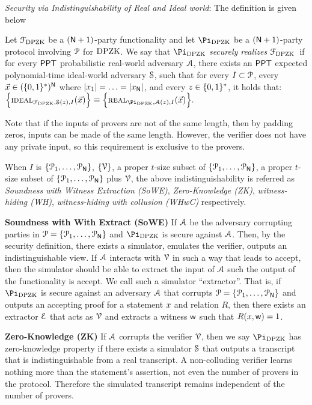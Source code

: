 \noindent\textit{Security via Indistinguishability of Real and Ideal world}: The definition is given below
\begin{definition}
Let $\mathcal{F}_{\text{DPZK}}$ be a $(\mathsf{N}+1)$-party  functionality and let $\Pi_{\DPZK}$ be a $(\mathsf{N}+1)$-party protocol involving $\mathcal{P}$ for $\text{DPZK}$. We say that  $\Pi_\DPZK$ {\em securely realizes} $\mathcal{F}_{\text{DPZK}}$~if for every $\mathsf{PPT}$ probabilistic  real-world adversary $\mathcal{A}$, there exists an $\mathsf{PPT}$  expected polynomial-time ideal-world adversary $\mathcal{S}$, such that for every $I \subset \mathcal{P}$, every $\vec{x} \in (\{0,1\}^*)^{\mathsf{N}}$ where $\left\lvert x_1 \right\rvert = \ldots= \left\lvert x_{\mathsf{N}} \right\rvert$, and every $z \in \{0,1\}^*$, it holds that:
	$\Big\{\Ideal_{\Func_{\DPZK}, \Sim(z),I}(\vec{x}) \Big\} \equiv \Big\{ \Real_{\Pi_\DPZK, \Adv(z),I}(\vec{x}) \Big\}. $

Note that if the inputs of provers are not of the same length, then by padding zeros, inputs can be made of the same length. However, the verifier does not have any private input, so this requirement is exclusive to the provers.

When $I$ is  $\{\mathcal{P}_1,\ldots,\mathcal{P}_{\mathsf{N}}\}$, $\{\mathcal{V}\}$, a proper $t$-size subset of $\{\mathcal{P}_1,\ldots,\mathcal{P}_{\mathsf{N}}\}$, a proper $t$-size subset of $\{\mathcal{P}_1,\ldots,\mathcal{P}_{\mathsf{N}}\}$ plus   $\mathcal{V}$, the above indistinguishability  is referred as {\em Soundness with Witness Extraction (SoWE)}, {\em Zero-Knowledge (ZK)}, {\em witness-hiding (WH)}, {\em witness-hiding with collusion (WHwC)} respectively.   	
\end{definition}

{\bf Soundness with With Extract (SoWE)} If $\mathcal{A}$ be the adversary corrupting parties in $\mathcal{P} = \{ \mathcal{P}_1, \ldots, \mathcal{P}_{\mathsf{N}}\}$ and $\Pi_\DPZK$ is secure against $\mathcal{A}$. Then, by the security definition, there exists a simulator, emulates the verifier, outputs an indistinguishable view. If $\mathcal{A}$ interacts with $\mathcal{V}$ in such a way that leads to accept, then the simulator should be able to extract the input of $\mathcal{A}$ such the output of the functionality is accept. We call such a simulator ``extractor''. 
That is, if $\Pi_{\DPZK}$ is secure against an adversary $\mathcal{A}$ that corrupts $\mathcal{P} = \{\mathcal{P}_1, \ldots, \mathcal{P}_{\mathsf{N}}\}$ and outputs an accepting proof for a statement ${x}$ and relation $R$, then there exists an extractor $\mathcal{E}$ that acts as $\mathcal{V}$ and extracts a witness $\mathsf{w}$ such that $R({x}, \mathsf{w}) = 1$.

{\bf Zero-Knowledge (ZK)} If $\mathcal{A}$ corrupts the verifier $\mathcal{V}$, then we say $\Pi_{\DPZK}$ has zero-knowledge property if there exists a simulator $\mathcal{S}$ that outputs a transcript that is indistinguishable from a real transcript. A non-colluding verifier learns nothing more than the statement's assertion, not even the number of provers in the protocol. Therefore the simulated transcript remains independent of the number of provers.  

